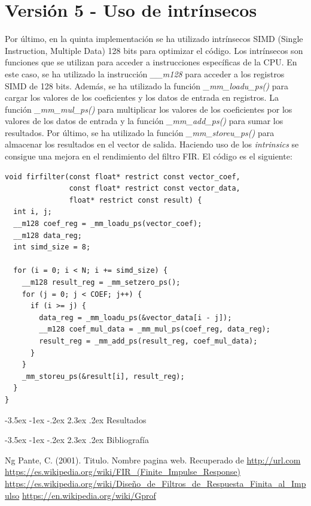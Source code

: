 \documentclass[11pt]{report}
\makeatletter
\renewcommand\chapter{\@startsection{chapter}{0}{\z@}%
    {-3.5ex \@plus -1ex \@minus -.2ex}%
    {2.3ex \@plus.2ex}%
    {\normalfont\Large\bfseries}}
\makeatother
\begin{document}

\section{Versión 5 - Uso de intrínsecos}
Por último, en la quinta implementación se ha utilizado intrínsecos SIMD (Single Instruction, Multiple Data) 128 bits para optimizar el código.
Los intrínsecos son funciones que se utilizan para acceder a instrucciones específicas de la CPU. En este caso, se ha utilizado la instrucción
\emph{\_\_m128} para acceder a los registros SIMD de 128 bits. Además, se ha utilizado la función \emph{\_mm\_loadu\_ps()} para cargar los valores
de los coeficientes y los datos de entrada en registros. La función \emph{\_mm\_mul\_ps()} para multiplicar los valores de los coeficientes por los valores
de los datos de entrada y la función \emph{\_mm\_add\_ps()} para sumar los resultados. Por último, se ha utilizado la función \emph{\_mm\_storeu\_ps()} para
almacenar los resultados en el vector de salida. Haciendo uso de los \emph{intrinsics} se consigue una mejora en el rendimiento del filtro FIR. El código es el siguiente:

\begin{lstlisting}
void firfilter(const float* restrict const vector_coef, 
               const float* restrict const vector_data, 
               float* restrict const result) {
  int i, j;
  __m128 coef_reg = _mm_loadu_ps(vector_coef);  
  __m128 data_reg;
  int simd_size = 8;

  for (i = 0; i < N; i += simd_size) {
    __m128 result_reg = _mm_setzero_ps();
    for (j = 0; j < COEF; j++) {
      if (i >= j) {
        data_reg = _mm_loadu_ps(&vector_data[i - j]);
        __m128 coef_mul_data = _mm_mul_ps(coef_reg, data_reg);
        result_reg = _mm_add_ps(result_reg, coef_mul_data);
      }
    }
    _mm_storeu_ps(&result[i], result_reg);
  }
}
\end{lstlisting}

\chapter{Resultados}

\newpage

\chapter{Bibliografía} %
\begin{thebibliography}{99}
       Ng Pante, C. (2001). Titulo. Nombre pagina web. Recuperado de \url{http://url.com}
       \url{https://es.wikipedia.org/wiki/FIR_(Finite_Impulse_Response)}
       \url{https://es.wikipedia.org/wiki/Diseño_de_Filtros_de_Respuesta_Finita_al_Impulso}
       \url{https://en.wikipedia.org/wiki/Gprof}
\end{thebibliography}
\end{document}
